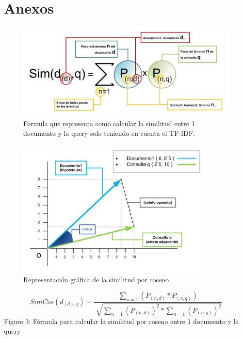 \documentclass[12pt]{article}
\begin{document}
\section*{Anexos}
\begin{figure}[h]
    \includegraphics[width=15cm]{1.jpg}
    \caption{Formula que representa como calcular la similitud entre 1 documento y la
        query solo teniendo en cuenta el TF-IDF.}
\end{figure}


\begin{figure}[h]
    \includegraphics[width=10cm]{2.jpg}
    \caption{Representación gráfica de la similitud por coseno}
\end{figure}
\begin{equation}
    SimCos(d_{(d),q})=\frac{\sum_{n = 1}^{}(P_{( n,d) } * P_{( n,q) })   }{\sqrt[]{\sum_{n = 1}(P_{(n,d)})^2 * \sum_{n=1}(P_{(n,q)})^2}  }
\end{equation}
Figure 3: Fórmula para calcular la similitud por coseno entre 1 documento y la query
\end{document}
